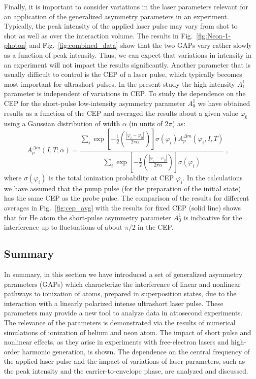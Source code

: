 Finally, it is important to consider variations in the laser parameters relevant for an application of the generalized asymmetry parameters in an experiment. Typically, the peak intensity of the applied laser pulse may vary from shot to shot as well as over the interaction volume. The results in Fig.\ \ref{fig:Neon-1-photon} and Fig.\ \ref{fig:combined_data} show that the two GAPs vary rather slowly as a function of peak intensity. Thus, we can expect that variations in intensity in an experiment will not impact the results significantly. Another parameter that is usually difficult to control is the CEP of a laser pulse, which typically becomes most important for ultrashort pulses. In the present study the high-intensity $A_1^{1}$ parameter is independent of variations in CEP. To study the dependence on the CEP for the short-pulse low-intensity asymmetry parameter $A_0^{1}$ we have obtained results as a function of the CEP and averaged the results about a given value $\varphi_0$ using a Gaussian distribution of width $\alpha$ (in units of $2\pi$) as: 
%
\begin{equation}
A_{p}^{\Delta m}(I, T; \alpha)
= 
\frac{\sum_i \exp\left[-\frac{1}{2}\left(\frac{|\varphi_i-\varphi_0|}{2\pi\alpha}\right)\right] \sigma(\varphi_i) A_{p}^{\Delta m}(\varphi_i,I,T) }
{\sum_i\exp\left[-\frac{1}{2}\left(\frac{|\varphi_i-\varphi_0|}{2\pi\alpha}\right)\right]\sigma(\varphi_i)}\; ,
    \label{eq:PAD_gauss_window}
\end{equation}
%
where $\sigma(\varphi_i)$ is the total ionization probability at CEP $\varphi_i$. 
In the calculations we have assumed that the pump pulse (for the preparation of the initial state) has the same CEP as the probe pulse.
The comparison of the results for different averages in Fig.\ \ref{fig:cep_avg} with the results for fixed CEP (solid line) shows that for He atom the short-pulse asymmetry parameter $A_0^1$ is indicative for the interference up to fluctuations of about $\pi/2$ in the CEP. 


\subsection{Summary}


In summary, in this section we have introduced a set of generalized asymmetry parameters (GAPs) which characterize the interference of linear and nonlinear pathways to ionization of atoms, prepared in superposition states, due to the interaction with a linearly polarized intense ultrashort laser pulse. These parameters may provide a new tool to analyze data in attosecond experiments. The relevance of the parameters is demonstrated via the results of numerical simulations of ionization of helium and neon atom. The impact of short pulse and nonlinear effects, as they arise in experiments with free-electron lasers and high-order harmonic generation, is shown. The dependence on the central frequency of the applied laser pulse and the impact of variations of laser parameters, such as the peak intensity and the carrier-to-envelope phase, are analyzed and discussed.


